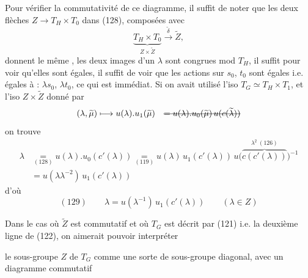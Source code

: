 \documentclass[11pt,a4paper]{article}
\begin{document}
Pour vérifier la commutativité de ce diagramme, il suffit de  noter que
les \struck{\ill{}} deux flèches \struck{\ill{}} $Z\to T_H\times T_0$ dans (128), composées avec
\[
\underbrace{T_H\times T_0}_{Z\times\widetilde{Z}} \xrightarrow{\;\widetilde{\delta}\;}
\widetilde{Z} ,
\]
donnent le même \ill{}, les deux images d'un $\lambda$ sont congrues mod $T_H$, il suffit pour
voir qu'elles sont égales, il suffit de voir que les  actions sur $s_0$,
$t_0$ sont égales i.e. égales à : $\lambda s_0$, $\lambda t_0$, ce qui est immédiat. Si on avait
utilisé l'iso $T_G\simeq T_H\times T_1$, et l'iso $Z\times\widetilde{Z}$ donné par
\[
(\lambda,\widetilde{\mu}) \longmapsto u(\lambda).u_1(\widetilde{\mu})
\quad \text{\struck{$= u(\lambda).u_0(\widetilde{\mu})\,u(c(\widetilde{\lambda}))$}}
\]
on trouve
\[
\begin{aligned}
\lambda &\underset{(128)}{=} u(\lambda).u_0(c'(\lambda))
\underset{(119)}{=} u(\lambda)\,u_1(c'(\lambda))\,
u\bigl(\overbrace{c(c'(\lambda))}^{\lambda^2\ (126)}\bigr)^{-1}\\
&= u(\lambda\lambda^{-2})\,u_1(c'(\lambda))
\end{aligned}
\]
d'où
\[
(129)\qquad \lambda = u(\lambda^{-1})\,u_1(c'(\lambda)) \qquad (\lambda\in Z)
\]

Dans le cas où $\widetilde{Z}$ est commutatif et où $T_G$ est décrit par (121) i.e. la
deuxième ligne de (122), on aimerait pouvoir interpréter

le sous-groupe $Z$ de $T_G$ comme une sorte de sous-groupe diagonal, avec un diagramme
commutatif



\end{document}
